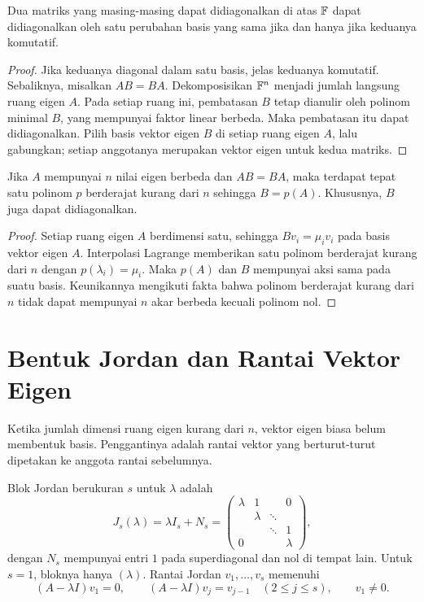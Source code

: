 \begin{teorema}
    Dua matriks yang masing-masing dapat didiagonalkan di atas $\mathbb{F}$
    dapat didiagonalkan oleh satu perubahan basis yang sama jika dan
    hanya jika keduanya komutatif.
\end{teorema}
\begin{proof}
    Jika keduanya diagonal dalam satu basis, jelas keduanya komutatif.
    Sebaliknya, misalkan $AB=BA$.
    Dekomposisikan $\mathbb{F}^n$ menjadi jumlah langsung ruang eigen $A$.
    Pada setiap ruang ini, pembatasan $B$ tetap dianulir oleh polinom
    minimal $B$, yang mempunyai faktor linear berbeda.
    Maka pembatasan itu dapat didiagonalkan.
    Pilih basis vektor eigen $B$ di setiap ruang eigen $A$, lalu gabungkan;
    setiap anggotanya merupakan vektor eigen untuk kedua matriks.
\end{proof}

\begin{teorema}
    Jika $A$ mempunyai $n$ nilai eigen berbeda dan $AB=BA$, maka
    terdapat tepat satu polinom $p$ berderajat kurang dari $n$ sehingga
    $B=p(A)$. Khususnya, $B$ juga dapat didiagonalkan.
\end{teorema}
\begin{proof}
    Setiap ruang eigen $A$ berdimensi satu, sehingga $Bv_i=\mu_iv_i$
    pada basis vektor eigen $A$.
    Interpolasi Lagrange memberikan satu polinom berderajat kurang
    dari $n$ dengan $p(\lambda_i)=\mu_i$.
    Maka $p(A)$ dan $B$ mempunyai aksi sama pada suatu basis.
    Keunikannya mengikuti fakta bahwa polinom berderajat kurang dari
    $n$ tidak dapat mempunyai $n$ akar berbeda kecuali polinom nol.
\end{proof}

\section{Bentuk Jordan dan Rantai Vektor Eigen}
\label{eigen:jordan}

Ketika jumlah dimensi ruang eigen kurang dari $n$, vektor eigen biasa
belum membentuk basis. Penggantinya adalah rantai vektor yang
berturut-turut dipetakan ke anggota rantai sebelumnya.

\begin{definisi}
    Blok Jordan berukuran $s$ untuk $\lambda$ adalah
    \[
        J_s(\lambda)=\lambda I_s+N_s
        =\begin{pmatrix}
            \lambda&1&&0\\&\lambda&\ddots&\\&&\ddots&1\\0&&&\lambda
        \end{pmatrix},
    \]
    dengan $N_s$ mempunyai entri $1$ pada superdiagonal dan nol
    di tempat lain. Untuk $s=1$, bloknya hanya $(\lambda)$.
    Rantai Jordan $v_1,\ldots,v_s$ memenuhi
    \[
        (A-\lambda I)v_1=0,\qquad
        (A-\lambda I)v_j=v_{j-1}\quad(2\le j\le s),\qquad v_1\ne0.
    \]
\end{definisi}

